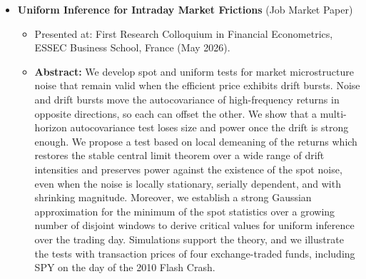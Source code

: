 \documentclass[12pt,a4paper]{article}
\begin{document}
\begin{itemize}
    \item \textbf{Uniform Inference for Intraday Market Frictions} (Job Market Paper)
    \begin{itemize}[label=$\circ$, leftmargin=2.2em, itemsep=0.6em, topsep=0.3em]
        \item  Presented at: 
        First Research Colloquium in Financial Econometrics, 
        ESSEC Business School, France (May 2026). 
        \item \textbf{Abstract:} We develop spot and uniform tests for market microstructure noise that remain valid
        when the efficient price exhibits drift bursts. 
        Noise and drift bursts move the 
        autocovariance of high-frequency returns in opposite directions, 
        so each can offset the other. 
        We show that a multi-horizon autocovariance test loses size and power once
        the drift is strong enough. 
        We propose a test based on local demeaning of the returns which 
        restores the stable central limit theorem over a wide range of drift intensities 
        and preserves power against the existence of the spot noise,
        even when the noise is locally stationary, 
        serially dependent, and with shrinking magnitude. 
        Moreover, we establish a strong Gaussian approximation 
        for the minimum of the spot statistics over a growing number of disjoint windows 
        to derive critical values for uniform inference over the trading day.
        Simulations support the theory, and we illustrate the tests with transaction prices of
        four exchange-traded funds, including SPY on the day of the 2010 Flash Crash.\\
    \end{itemize}


\end{itemize}
\end{document}
